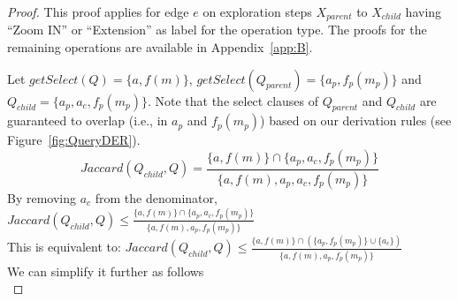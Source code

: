 \sloppy

\begin{proof}
This proof applies for edge $e$  on exploration steps $X_{parent}$ to $X_{child}$ having ``Zoom IN'' or ``Extension''  as label for the operation type. 
The proofs for the remaining operations are available in Appendix~\ref{app:B}. 

Let $getSelect(Q) = \{a, f(m)\}$, $getSelect(Q_{parent}) = \{ a_p, f_p(m_p)\}$ and $Q_{child} = \{a_p, a_c, f_p(m_p)\}$. Note that the select clauses of $Q_{parent}$ and $Q_{child}$ are guaranteed to overlap (i.e., in $a_p$ and $f_p(m_p)$) based on our derivation rules (see Figure~\ref{fig:QueryDER}). 
\sloppy
\vspace{-1em}
\[Jaccard(Q_{child},Q)=  \frac{  \{a, f(m)\} \cap  \{ a_p, a_c, f_p(m_p) \} } {\{ a, f(m), a_p, a_c, f_p(m_p) \}}\]
\vspace{1em}
By removing $a_c$ from the denominator,\\
$ Jaccard(Q_{child},Q) \leq  \frac{  \{a, f(m)\} \cap  \{ a_p, a_c, f_p(m_p) \} } {\{ a, f(m), a_p, f_p(m_p) \}}$\\
This is equivalent to:
\vspace{1em}
$Jaccard(Q_{child},Q)   \leq    \frac{ \{a, f(m) \} \cap \left(\{ a_p, f_p(m_p) \} \cup \{ a_c \}   \right) }{\{ a, f(m), a_p, f_p(m_p) \} }  $\\
\vspace{1em}
We can simplify it further as follows\\
\hspace{2em}

\vspace{0.5em}

\vspace{0.5em}

\vspace{0.5em}

\end{proof}

